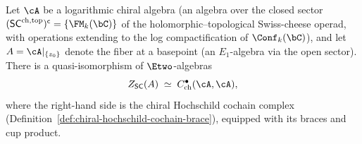 \begin{theorem}
\label{thm:operadic-center-hochschild}
Let $\cA$ be a logarithmic chiral algebra
\textup{(}an algebra over the closed sector
$(\mathsf{SC}^{\mathrm{ch,top}})^{\mathsf{c}} = \{\FM_k(\bC)\}$
of the holomorphic--topological Swiss-cheese operad, with
operations extending to the log compactification of
$\Conf_k(\bC)$\textup{)}, and
let $A = \cA|_{\{z_0\}}$ denote the fiber at a basepoint
\textup{(}an $E_1$-algebra via the open sector\textup{)}. There is
a quasi-isomorphism of $\Etwo$-algebras
\begin{equation}\label{eq:center-hochschild-qi}
Z_{\mathsf{SC}}(A)
\;\simeq\;
C^{\bullet}_{\mathrm{ch}}(\cA, \cA),
\end{equation}
where the right-hand side is the chiral Hochschild cochain complex
\textup{(}Definition~\textup{\ref{def:chiral-hochschild-cochain-brace})},
equipped with its braces and cup product.
\end{theorem}

